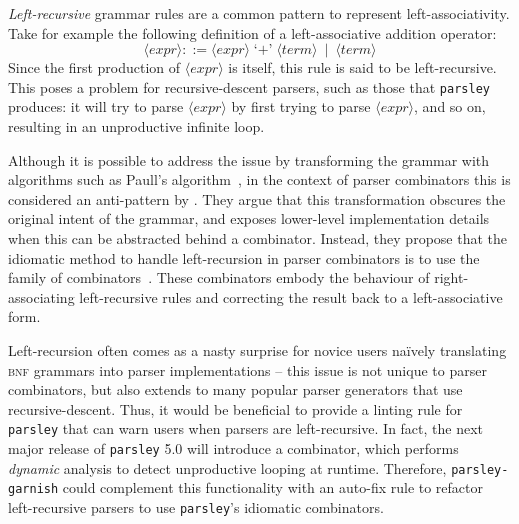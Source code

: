 \documentclass[../../main.tex]{subfiles}
\begin{document}
\label{sec:factor-leftrec}

\emph{Left-recursive} grammar rules are a common pattern to represent left-associativity.
Take for example the following definition of a left-associative addition operator:
\begin{equation*}
\langle \mathit{expr} \rangle ::= \langle \mathit{expr} \rangle \; \text{`+'} \; \langle \mathit{term} \rangle \enspace | \enspace \langle \mathit{term} \rangle
\end{equation*}
%
Since the first production of $\langle \mathit{expr} \rangle$ is itself, this rule is said to be left-recursive.
This poses a problem for recursive-descent parsers, such as those that \texttt{parsley} produces:
it will try to parse $\langle \mathit{expr} \rangle$ by first trying to parse $\langle \mathit{expr} \rangle$, and so on, resulting in an unproductive infinite loop.

Although it is possible to address the issue by transforming the grammar with algorithms such as Paull's algorithm~\cite{moore_removing_2000},
in the context of parser combinators this is considered an anti-pattern by \textcite{willis_design-haskell_2021}.
They argue that this transformation obscures the original intent of the grammar, and exposes lower-level implementation details when this can be abstracted behind a combinator.
Instead, they propose that the idiomatic method to handle left-recursion in parser combinators is to use the  family of combinators~\cite{fokker_functional_1995}.
These combinators embody the behaviour of right-associating left-recursive rules and correcting the result back to a left-associative form.

Left-recursion often comes as a nasty surprise for novice users naïvely translating \textsc{bnf} grammars into parser implementations -- this issue is not unique to parser combinators, but also extends to many popular parser generators that use recursive-descent.
Thus, it would be beneficial to provide a linting rule for \texttt{parsley} that can warn users when parsers are left-recursive.
In fact, the next major release of \texttt{parsley} 5.0 will introduce a  combinator, which performs \emph{dynamic} analysis to detect unproductive looping at runtime.
Therefore, \texttt{parsley-garnish} could complement this functionality with an auto-fix rule to refactor left-recursive parsers to use \texttt{parsley}'s idiomatic  combinators.
\end{document}
